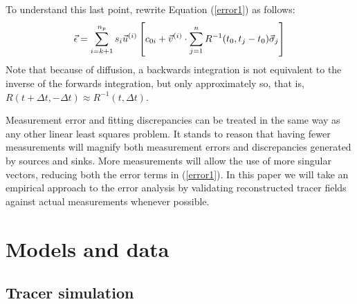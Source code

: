 To understand this last point, rewrite Equation (\ref{error1}) as follows:
\begin{equation}
	\vec \epsilon = \sum_{i=k+1}^{n_p} s_i \vec u^{(i)} \left [c_{0i}
	+ \vec v^{(i)} \cdot \sum_{j=1}^n R^{-1}(t_0, t_j-t_0) \vec \sigma_j \right ]
\end{equation}
Note that because of diffusion, 
a backwards integration is not equivalent to the inverse of the
forwards integration, but only approximately so, that is,
$R(t+\Delta t, -\Delta t) \approx R^{-1}(t, \Delta t)$.

Measurement error and fitting discrepancies can be treated in the same way 
as any other linear least squares problem. 
It stands to reason that having fewer measurements will magnify both
measurement errors and discrepancies generated by sources and sinks.
More measurements will allow the use of more singular vectors,
reducing both the error terms in (\ref{error1}).
In this paper we will take an empirical approach to the error analysis by
validating reconstructed tracer fields against actual measurements whenever
possible.

\section{Models and data}

\subsection{Tracer simulation}

